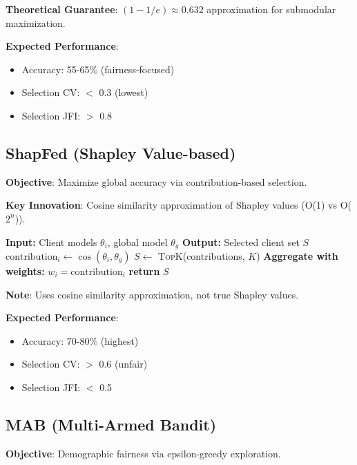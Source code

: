 \documentclass{article}
\begin{document}
\textbf{Theoretical Guarantee}: $(1-1/e) \approx 0.632$ approximation for submodular maximization.

\textbf{Expected Performance}:
\begin{itemize}
    \item Accuracy: 55-65\% (fairness-focused)
    \item Selection CV: $<$ 0.3 (lowest)
    \item Selection JFI: $>$ 0.8
\end{itemize}

\subsection{ShapFed (Shapley Value-based)}

\textbf{Objective}: Maximize global accuracy via contribution-based selection.

\textbf{Key Innovation}: Cosine similarity approximation of Shapley values (O(1) vs O($2^n$)).

\begin{algorithm}[H]
\caption{ShapFed Client Selection}
\begin{algorithmic}[1]
\State \textbf{Input:} Client models $\theta_i$, global model $\theta_g$
\State \textbf{Output:} Selected client set $S$
    \State $\text{contribution}_i \leftarrow \cos(\theta_i, \theta_g)$
\EndFor
\State $S \leftarrow$ \textsc{TopK}(contributions, $K$)
\State \textbf{Aggregate with weights:} $w_i = \text{contribution}_i$
\State \textbf{return} $S$
\end{algorithmic}
\end{algorithm}

\textbf{Note}: Uses cosine similarity approximation, not true Shapley values.

\textbf{Expected Performance}:
\begin{itemize}
    \item Accuracy: 70-80\% (highest)
    \item Selection CV: $>$ 0.6 (unfair)
    \item Selection JFI: $<$ 0.5
\end{itemize}

\subsection{MAB (Multi-Armed Bandit)}

\textbf{Objective}: Demographic fairness via epsilon-greedy exploration.
\end{document}
